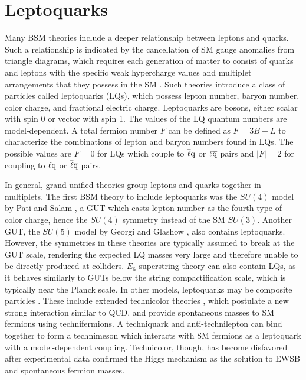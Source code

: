 \section{Leptoquarks
\label{sec:LQ}}

Many BSM theories include a deeper relationship between leptons and quarks. Such a relationship is indicated by the cancellation of SM gauge anomalies from triangle diagrams, which requires each generation of matter to consist of quarks and leptons with the specific weak hypercharge values and multiplet arrangements that they possess in the SM \cite{Peskin}. Such theories introduce a class of particles called leptoquarks (LQs), which possess lepton number, baryon number, color charge, and fractional electric charge. Leptoquarks are bosons, either scalar with spin 0 or vector with spin 1. The values of the LQ quantum numbers are model-dependent. A total fermion number $F$ can be defined as $F = 3B + L$ to characterize the combinations of lepton and baryon numbers found in LQs. The possible values are $F=0$ for LQs which couple to $\overline{\ell}\mathrm{q}$ or $\ell\overline{\mathrm{q}}$ pairs and $|F|=2$ for coupling to $\ell\mathrm{q}$ or $\overline{\ell}\overline{\mathrm{q}}$ pairs.

In general, grand unified theories group leptons and quarks together in multiplets. The first BSM theory to include leptoquarks was the $SU(4)$ model by Pati and Salam \cite{SU4}, a GUT which casts lepton number as the fourth type of color charge, hence the $SU(4)$ symmetry instead of the SM $SU(3)$. Another GUT, the $SU(5)$ model by Georgi and Glashow \cite{GUT}, also contains leptoquarks. However, the symmetries in these theories are typically assumed to break at the GUT scale, rendering the expected LQ masses very large and therefore unable to be directly produced at colliders. $E_6$ superstring theory \cite{SUPERSTR} can also contain LQs, as it behaves similarly to GUTs below the string compactification scale, which is typically near the Planck scale. In other models, leptoquarks may be composite particles \cite{LQ3b}. These include extended technicolor theories \cite{TC3}, which postulate a new strong interaction similar to QCD, and provide spontaneous masses to SM fermions using technifermions. A techniquark and anti-technilepton can bind together to form a technimeson which interacts with SM fermions as a leptoquark with a model-dependent coupling. Technicolor, though, has become disfavored after experimental data confirmed the Higgs mechanism as the solution to EWSB and spontaneous fermion masses.

